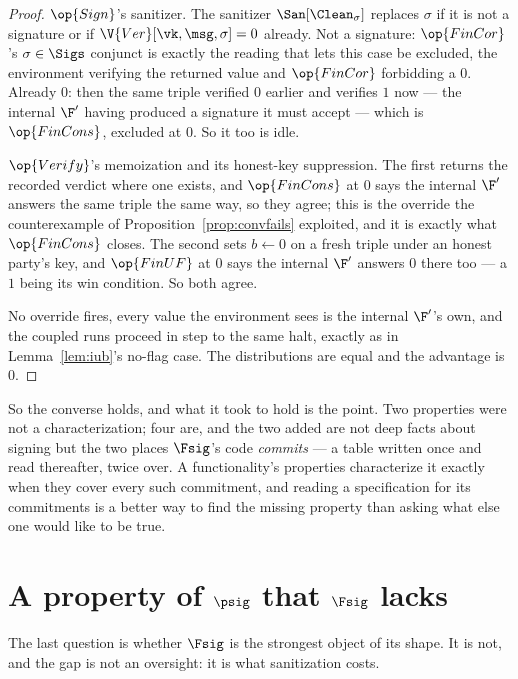 \documentclass[10pt,oneside,openany]{book}
\theoremstyle{accentdef}
\theoremstyle{accentplain}
\begin{document}
\begin{proof}
$\op{Sign}$'s sanitizer. The sanitizer $\San[\Clean_{\sigma}]$ replaces $\sigma$ if it is not a signature or if
$\V{Ver}[\vk,\msg,\sigma] = 0$ already. Not a signature: $\op{FinCor}$'s $\sigma \in \Sigs$
conjunct is exactly the reading that lets this case be excluded, the environment verifying the
returned value and $\op{FinCor}$ forbidding a $0$. Already $0$: then the same triple verified $0$
earlier and verifies $1$ now --- the internal $\F'$ having produced a signature it must accept ---
which is $\op{FinCons}$, excluded at $0$. So it too is idle.

$\op{Verify}$'s memoization and its honest-key suppression. The first returns the recorded verdict
where one exists, and $\op{FinCons}$ at $0$ says the internal $\F'$ answers the same triple the
same way, so they agree; this is the override the counterexample of
Proposition~\ref{prop:convfails} exploited, and it is exactly what $\op{FinCons}$ closes. The
second sets $b \gets 0$ on a fresh triple under an honest party's key, and $\op{FinUF}$ at $0$ says
the internal $\F'$ answers $0$ there too --- a $1$ being its win condition. So both agree.

No override fires, every value the environment sees is the internal $\F'$'s own, and the coupled
runs proceed in step to the same halt, exactly as in Lemma~\ref{lem:iub}'s no-flag case. The
distributions are equal and the advantage is $0$.
\end{proof}

So the converse holds, and what it took to hold is the point. Two properties were not a
characterization; four are, and the two added are not deep facts about signing but the two places
$\Fsig$'s code \emph{commits} --- a table written once and read thereafter, twice over. A
functionality's properties characterize it exactly when they cover every such commitment, and
reading a specification for its commitments is a better way to find the missing property than
asking what else one would like to be true.

\section{A property of \texorpdfstring{$\psig$}{π\_Sig} that \texorpdfstring{$\Fsig$}{F\_Sig} lacks}\label{sec:sigcoll}

The last question is whether $\Fsig$ is the strongest object of its shape. It is not, and the
gap is not an oversight: it is what sanitization costs.
\end{document}
